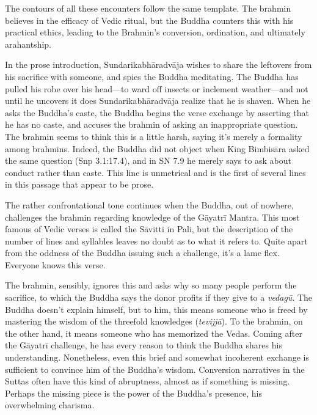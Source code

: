\documentclass[12pt,openany]{book}%
\begin{document}
The contours of all these encounters follow the same template. The brahmin believes in the efficacy of Vedic ritual, but the Buddha counters this with his practical ethics, leading to the Brahmin’s conversion, ordination, and ultimately arahantship.

In the prose introduction, \textsanskrit{Sundarikabhāradvāja} wishes to share the leftovers from his sacrifice with someone, and spies the Buddha meditating. The Buddha has pulled his robe over his head—to ward off insects or inclement weather—and not until he uncovers it does \textsanskrit{Sundarikabhāradvāja} realize that he is shaven. When he asks the Buddha’s caste, the Buddha begins the verse exchange by asserting that he has no caste, and accuses the brahmin of asking an inappropriate question. The brahmin seems to think this is a little harsh, saying it’s merely a formality among brahmins. Indeed, the Buddha did not object when King \textsanskrit{Bimbisāra} asked the same question (Snp 3.1:17.4), and in SN 7.9 he merely says to ask about conduct rather than caste. This line is unmetrical and is the first of several lines in this passage that appear to be prose.

The rather confrontational tone continues when the Buddha, out of nowhere, challenges the brahmin regarding knowledge of the \textsanskrit{Gāyatrī} Mantra. This most famous of Vedic verses is called the \textsanskrit{Sāvitti} in Pali, but the description of the number of lines and syllables leaves no doubt as to what it refers to. Quite apart from the oddness of the Buddha issuing such a challenge, it’s a lame flex. Everyone knows this verse.

The brahmin, sensibly, ignores this and asks why so many people perform the sacrifice, to which the Buddha says the donor profits if they give to a \textit{\textsanskrit{vedagū}}. The Buddha doesn’t explain himself, but to him, this means someone who is freed by mastering the wisdom of the threefold knowledges (\textit{\textsanskrit{tevijjā}}). To the brahmin, on the other hand, it means someone who has memorized the Vedas. Coming after the \textsanskrit{Gāyatrī} challenge, he has every reason to think the Buddha shares his understanding. Nonetheless, even this brief and somewhat incoherent exchange is sufficient to convince him of the Buddha’s wisdom. Conversion narratives in the Suttas often have this kind of abruptness, almost as if something is missing. Perhaps the missing piece is the power of the Buddha’s presence, his overwhelming charisma.
\end{document}
